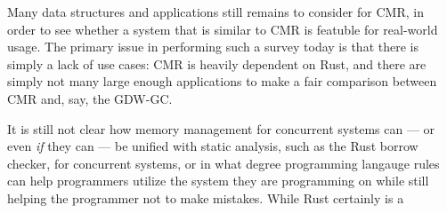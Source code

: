 Many data structures and applications still remains to consider for CMR\@, in order to see whether
a system that is similar to CMR is featuble for real-world usage. The primary issue in performing
such a survey today is that there is simply a lack of use cases: CMR is heavily dependent on Rust,
and there are simply not many large enough applications to make a fair comparison between CMR and,
say, the GDW-GC\@.

It is still not clear how memory management for concurrent systems can --- or even \emph{if} they
can --- be unified with static analysis, such as the Rust borrow checker, for concurrent systems,
or in what degree programming langauge rules can help programmers utilize the system they are
programming on while still helping the programmer not to make mistakes. While Rust certainly is a
